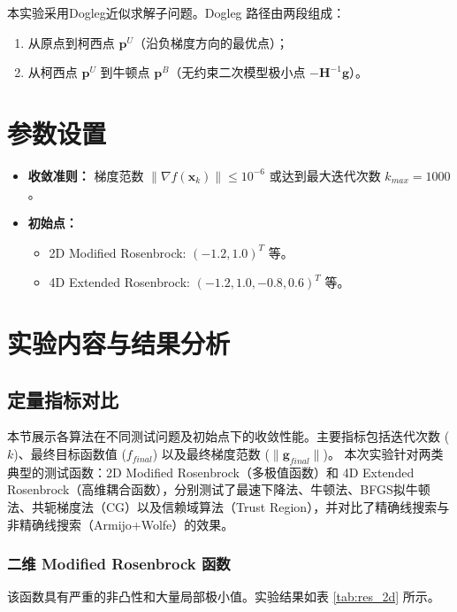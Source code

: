 \documentclass[a4paper,12pt]{article}
\begin{document}
本实验采用Dogleg近似求解子问题。Dogleg 路径由两段组成：
\begin{enumerate}
    \item 从原点到柯西点 $\bm{p}^U$（沿负梯度方向的最优点）；
    \item 从柯西点 $\bm{p}^U$ 到牛顿点 $\bm{p}^B$（无约束二次模型极小点 $-\bm{H}^{-1}\bm{g}$）。
\end{enumerate}


\section{参数设置}
\begin{itemize}
    \item \textbf{收敛准则：} 梯度范数 $\|\nabla f(\bm{x}_k)\| \le 10^{-6}$ 或达到最大迭代次数 $k_{max}=1000$。
    \item \textbf{初始点：}
    \begin{itemize}
        \item 2D Modified Rosenbrock: $(-1.2, 1.0)^T$ 等。
        \item 4D Extended Rosenbrock: $(-1.2, 1.0, -0.8, 0.6)^T$ 等。
    \end{itemize}
\end{itemize}


\section{实验内容与结果分析}
\subsection{定量指标对比}

本节展示各算法在不同测试问题及初始点下的收敛性能。主要指标包括迭代次数 ($k$)、最终目标函数值 ($f_{final}$) 以及最终梯度范数 ($\|\bm{g}_{final}\|$)。
本次实验针对两类典型的测试函数：2D Modified Rosenbrock（多极值函数）和 4D Extended Rosenbrock（高维耦合函数），分别测试了最速下降法、牛顿法、BFGS拟牛顿法、共轭梯度法（CG）以及信赖域算法（Trust Region），并对比了精确线搜索与非精确线搜索（Armijo+Wolfe）的效果。

\subsubsection{二维 Modified Rosenbrock 函数}
该函数具有严重的非凸性和大量局部极小值。实验结果如表 \ref{tab:res_2d} 所示。
\end{document}
